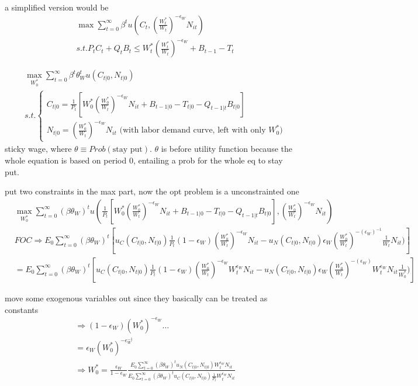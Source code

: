 \documentclass{article}
\begin{document}
a simplified version would be 
\begin{equation}
\begin{split}
& \max \sum\limits_{t=0}^{\infty}\beta^t u(C_t,(\frac{W_t^*}{W_t})^{-\epsilon_W}N_{it})
\\& s.t. P_t C_t +Q_t B_t \leqslant W_t^*(\frac{W_t^*}{W_t})^{-\epsilon_W}+B_{t-1}-T_t
\end{split}
\end{equation}


\begin{equation}
\begin{split}
& \max\limits_{W^*_0}  \sum\limits_{t=0}^{\infty}\beta^t \theta_W^t u(C_{t|0},N_{t|0})
\\& s.t. 
\begin{cases}
C_{t|0}=\frac{1}{P_t}[W_0^* (\frac{W_0^*}{W_t})^{-\epsilon_W}N_{it}+B_{t-1|0}-T_{t|0}-Q_{t-1|t}B_{t|0}]
\\
N_{t|0}=(\frac{W^*_0}{W_t})^{-\epsilon_W} N_{it} \text{ (with labor demand curve, left with only $W^*_0$)}
\end{cases}
\end{split}
\end{equation}
sticky wage, where $\theta \equiv Prob(\text{stay put})$. $\theta$ is before utility function because the whole equation is based on period 0, entailing a prob for the whole eq to stay put.


put two constraints in the max part, now the opt problem is a unconstrainted one
\begin{align}
& \max_{W_0^*} \sum\limits_{t=0}^{\infty} (\beta \theta_W )^t 
u(
{\frac{1}{P_t}[W_0^* (\frac{W_0^*}{W_t})^{-\epsilon_W}N_{it}+B_{t-1|0}-T_{t|0}-Q_{t-1|t}B_{t|0}]},
(\frac{W^*_0}{W_t})^{-\epsilon_W} N_{it}
)
\\& FOC \Rightarrow E_0 \sum\limits_{t=0}^{\infty} (\beta \theta_W)^t [u_C(C_{t|0},N_{t|0})\frac{1}{P_t}(1-\epsilon_W)(\frac{W_0^*}{W_t})^{-\epsilon_W}N_{it}-
u_N(C_{t|0},N_{t|0}) \epsilon_W (\frac{W_0^*}{W_t})^{-(\epsilon_W)^{-1}} \frac{1}{W_t} N_{it})
]
\\& = E_0 \sum_{t=0}^{\infty} (\beta \theta_W)^t [u_C(C_{t|0},N_{t|0})\frac{1}{P_t}(1-\epsilon_W) (\frac{W_0^*}{W_t})^{-\epsilon_W} W_t^{\epsilon_W} N_{it}-
u_N(C_{t|0},N_{t|0}) \epsilon_W (\frac{W_0^*}{W_t})^{-(\epsilon_W)} W_t^{\epsilon_W} N_{it} \frac{1}{W_0^*})
]
\end{align}

move some exogenous variables out since they basically can be treated as constants
\begin{align}
& \Rightarrow  (1-\epsilon_W)(W_0^*)^{-\epsilon_W} \dots  
\\& = \epsilon_W (W_0^*)^{-\epsilon_W^{-1}}
\\& \Rightarrow W_0^*=\frac{\epsilon_W}{1-\epsilon_W}
\frac{E_0 \sum\limits_{t=0}^{\infty} (\beta \theta_W)^t u_N(C_{t|0},N_{t|0})W_t^{\epsilon_W}N_{it}}{E_0 \sum\limits_{t=0}^{\infty} (\beta \theta_W)^t u_C(C_{t|0},N_{t|0})\frac{1}{P_t} W_t^{\epsilon_W} N_{it}}
\end{align}
\end{document}

